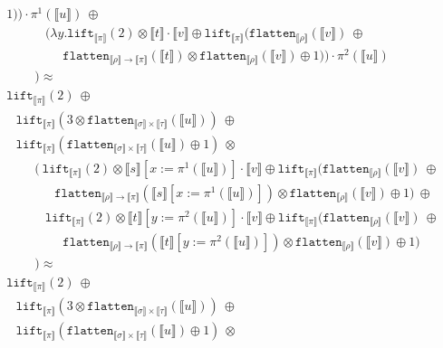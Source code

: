 \documentclass[runningheads,a4paper]{llncs}
\newcommand{\typeinterpret}[1]{\llbracket #1 \rrbracket}
\newcommand{\interpret}[1]{\llbracket #1 \rrbracket}
\newcommand{\arrtype}{\rightarrow}
\newcommand{\abs}[2]{\lambda #1.#2}
\newcommand{\flatten}{\mathtt{flatten}}
\newcommand{\lift}{\mathtt{lift}}
\begin{document}
\begin{itemize}
\[\begin{array}{l}
{    1)}) \cdot \pi^1(\interpret{u})\ \oplus \\
  \phantom{ABCD}
     (\abs{y}{\lift_{\typeinterpret{\pi}}(2) \otimes
     \interpret{t} \cdot \interpret{v} \oplus
    \lift_{\typeinterpret{\pi}}(
    \flatten_{\typeinterpret{\rho}}(\interpret{v})\ \oplus \\
  \phantom{ABCDEF} \flatten_{\typeinterpret{\rho} \arrtype
    \typeinterpret{\pi}}(\interpret{t}) \otimes
    \flatten_{\typeinterpret{\rho}}(\interpret{v}) \oplus 
    1)}) \cdot \pi^2(\interpret{u}) \\
  \phantom{ABC}) \approx \\
  \lift_{\typeinterpret{\pi}}(2)\ \oplus \\
  \phantom{A}
  \lift_{\typeinterpret{\pi}}(3 \otimes \flatten_{\typeinterpret{\sigma}
    \times \typeinterpret{\tau}}(\interpret{u}))\ \oplus \\
  \phantom{A}
  \lift_{\typeinterpret{\pi}}(\flatten_{\typeinterpret{\sigma} \times
    \typeinterpret{\tau}}(\interpret{u}) \oplus 1)\ \otimes \\
  \phantom{ABC}
  (\ \lift_{\typeinterpret{\pi}}(2) \otimes \interpret{s}[x:=\pi^1(
    \interpret{u})] \cdot \interpret{v} \oplus
    \lift_{\typeinterpret{\pi}}(\flatten_{
    \typeinterpret{\rho}}(\interpret{v})\ \oplus \\
  \phantom{ABCDE}\flatten_{\typeinterpret{\rho} \arrtype
    \typeinterpret{\pi}}(\interpret{s}[x:=\pi^1(\interpret{u})]) \otimes
    \flatten_{\typeinterpret{\rho}}(\interpret{v}) \oplus
    1)\ \oplus \\
  \phantom{ABCD}
  \lift_{\typeinterpret{\pi}}(2) \otimes \interpret{t}[y:=\pi^2(
    \interpret{u})] \cdot \interpret{v} \oplus
    \lift_{\typeinterpret{\pi}}(
    \flatten_{\typeinterpret{\rho}}(\interpret{v})\ \oplus \\
  \phantom{ABCDEF} \flatten_{\typeinterpret{\rho} \arrtype
    \typeinterpret{\pi}}(\interpret{t}[y:=\pi^2(\interpret{u})]) \otimes
    \flatten_{\typeinterpret{\rho}}(\interpret{v}) \oplus 
    1) \\
  \phantom{ABC}) \approx \\
  \lift_{\typeinterpret{\pi}}(2)\ \oplus \\
  \phantom{A}
  \lift_{\typeinterpret{\pi}}(3 \otimes \flatten_{\typeinterpret{\sigma}
    \times \typeinterpret{\tau}}(\interpret{u}))\ \oplus \\
  \phantom{A}
  \lift_{\typeinterpret{\pi}}(\flatten_{\typeinterpret{\sigma} \times
    \typeinterpret{\tau}}(\interpret{u}) \oplus 1)\ \otimes \\

\end{array}\]
\end{itemize}
\end{document}
